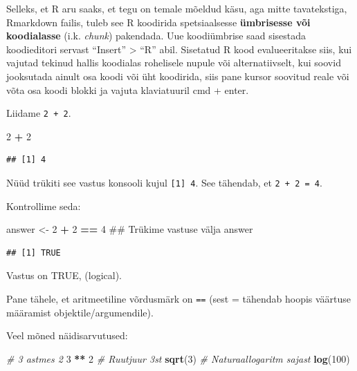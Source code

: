 \documentclass[]{book}
\newenvironment{Shaded}{\begin{snugshade}}{\end{snugshade}}
\newcommand{\KeywordTok}[1]{\textcolor[rgb]{0.13,0.29,0.53}{\textbf{#1}}}
\newcommand{\DecValTok}[1]{\textcolor[rgb]{0.00,0.00,0.81}{#1}}
\newcommand{\StringTok}[1]{\textcolor[rgb]{0.31,0.60,0.02}{#1}}
\newcommand{\CommentTok}[1]{\textcolor[rgb]{0.56,0.35,0.01}{\textit{#1}}}
\newcommand{\OperatorTok}[1]{\textcolor[rgb]{0.81,0.36,0.00}{\textbf{#1}}}
\newcommand{\NormalTok}[1]{#1}
\begin{document}
Selleks, et R aru saaks, et tegu on temale mõeldud käsu, aga mitte
tavatekstiga, Rmarkdown failis, tuleb see R koodirida spetsiaalsesse
\textbf{ümbrisesse või koodialasse} (i.k. \emph{chunk}) pakendada. Uue
koodiümbrise saad sisestada koodieditori servast ``Insert''
\textgreater{} ``R'' abil. Sisetatud R kood evalueeritakse siis, kui
vajutad tekinud hallis koodialas rohelisele nupule või alternatiivselt,
kui soovid jooksutada ainult osa koodi või üht koodirida, siis pane
kursor soovitud reale või võta osa koodi blokki ja vajuta klaviatuuril
cmd + enter.

Liidame \texttt{2\ +\ 2}.

\begin{Shaded}
\begin{Highlighting}[]
\DecValTok{2} \OperatorTok{+}\StringTok{ }\DecValTok{2}
\end{Highlighting}
\end{Shaded}

\begin{verbatim}
## [1] 4
\end{verbatim}

Nüüd trükiti see vastus konsooli kujul \texttt{{[}1{]}\ 4}. See
tähendab, et \texttt{2\ +\ 2\ =\ 4}.

Kontrollime seda:

\begin{Shaded}
\begin{Highlighting}[]
\NormalTok{answer <-}\StringTok{ }\DecValTok{2} \OperatorTok{+}\StringTok{ }\DecValTok{2} \OperatorTok{==}\StringTok{ }\DecValTok{4}
\NormalTok{## Trükime vastuse välja}
\NormalTok{answer}
\end{Highlighting}
\end{Shaded}

\begin{verbatim}
## [1] TRUE
\end{verbatim}

Vastus on TRUE, (logical).

Pane tähele, et aritmeetiline võrdusmärk on \texttt{==} (sest = tähendab
hoopis väärtuse määramist objektile/argumendile).

Veel mõned näidisarvutused:

\begin{Shaded}
\begin{Highlighting}[]
\CommentTok{# 3 astmes 2}
\DecValTok{3} \OperatorTok{**}\StringTok{ }\DecValTok{2}
\CommentTok{# Ruutjuur 3st}
\KeywordTok{sqrt}\NormalTok{(}\DecValTok{3}\NormalTok{)}
\CommentTok{# Naturaallogaritm sajast}
\KeywordTok{log}\NormalTok{(}\DecValTok{100}\NormalTok{)}
\end{Highlighting}
\end{Shaded}
\end{document}
